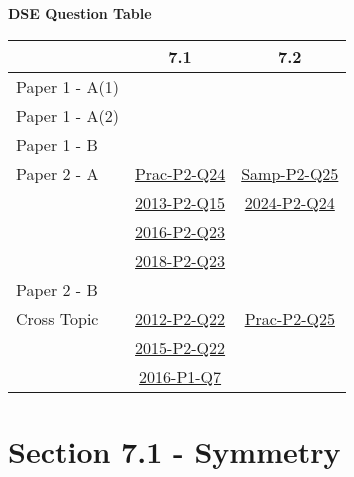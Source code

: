 \documentclass[12pt, a4paper]{article}
\begin{document}
\begin{absolutelynopagebreak}
\begin{center}
\textbf{DSE Question Table}
\end{center}
\begin{center}
\begin{tabular}{|l|c|c|}
\hline
        & 7.1 & 7.2 \\\hline
\hline
Paper 1 - A(1)&  &  \\
\hline
Paper 1 - A(2)&  &  \\
\hline
Paper 1 - B&  &  \\
\hline
\hline
Paper 2 - A& \hyperref[DSE2012P-CoreP2-Q24]{Prac-P2-Q24} & \hyperref[DSE2012S-CoreP2-Q25]{Samp-P2-Q25} \\
& \hyperref[DSE2013-CoreP2-Q15]{2013-P2-Q15} & \hyperref[DSE2024-CoreP2-Q24]{2024-P2-Q24} \\
& \hyperref[DSE2016-CoreP2-Q23]{2016-P2-Q23} &  \\
& \hyperref[DSE2018-CoreP2-Q23]{2018-P2-Q23} &  \\
\hline
Paper 2 - B&  &  \\
\hline
\hline
Cross Topic& \hyperref[DSE2012-CoreP2-Q22]{2012-P2-Q22} & \hyperref[DSE2012P-CoreP2-Q25]{Prac-P2-Q25} \\
& \hyperref[DSE2015-CoreP2-Q22]{2015-P2-Q22} &  \\
& \hyperref[DSE2016-CoreP1-Q07]{2016-P1-Q7} &  \\
\hline
\end{tabular}
\end{center}
\end{absolutelynopagebreak}




\section*{Section 7.1 - Symmetry}\label{section:1-7-1}
\end{document}

